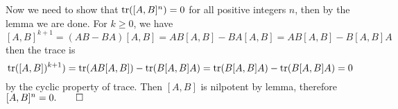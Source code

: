 \begin{enumerate}
    Now we need to show that $\operatorname{tr}([A,B]^n) = 0$ for all positive integers $n$, then by the lemma we are done. For $k \geq 0$, we have 
    \[
    [A,B]^{k+1} = (AB-BA)[A,B] = AB[A,B] - BA[A,B] = AB[A,B] - B[A,B]A	
    \] 
    then the trace is 
    \[
    \operatorname{tr}([A,B])^{k+1}) = \operatorname{tr}(AB[A,B]) - \operatorname{tr}(B[A,B]A) = \operatorname{tr}(B[A,B]A) - \operatorname{tr}(B[A,B]A) = 0
    \]
    by the cyclic property of trace. Then $[A,B]$ is nilpotent by lemma, therefore $[A,B]^n = 0. \qed$
\end{enumerate}